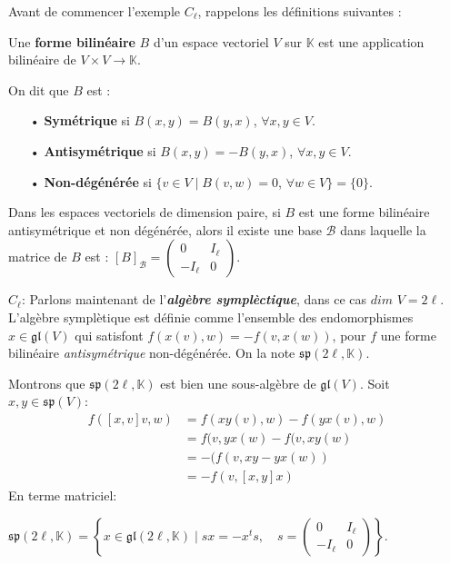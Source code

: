 \documentclass[a4paper,openany,12pt]{report}
\newcommand{\KK}{\mathbb{K}}
\newcommand{\gl}{\mathfrak{gl}}
\newcommand{\ssp}{\mathfrak{sp}}
\theoremstyle{break}
{\theorembodyfont{\upshape}
\newtheorem*{rmq}{Remarque :}
\newtheorem*{prv}{Preuve :}
\newtheorem*{ex}{Exemples :}
\newtheorem*{exe}{Exemple : }
\newtheorem*{nota}{Notation :}
\newtheorem*{dem}{D\'emonstration :}}
\begin{document}
Avant de commencer l'exemple $ C_{\ell} $, rappelons les définitions suivantes :

\begin{df} 
\quad Une \textbf{forme bilinéaire} $B$ d'un espace vectoriel $V$ sur $\KK$ est une application bilinéaire de $V\times V\to  \KK$.

On dit que $B$ est : 
\begin{itemize}
\item[•] \textbf{Symétrique} si $B(x,y)=B(y,x)$, $\forall x,y \in V$. 

\item[•] \textbf{Antisymétrique} si $B(x,y)=-B(y,x)$,  $\forall x,y \in V$. 

\item[•] \textbf{Non-dégénérée} si $\{ v \in V \mid B(v,w)=0$, $\forall w \in V \}= \{ 0 \}$.
\end{itemize}
\end{df}

\begin{rmq} 
\quad Dans  les espaces vectoriels de dimension paire, si $B$ est une forme bilinéaire antisymétrique et non dégénérée, alors il existe une base $\mathcal{B}$ dans laquelle la matrice de $B$ est : $[ B ]_\mathcal{B}=\begin{pmatrix} 0 & I_\ell \\ -I_\ell & 0 \end{pmatrix} $.
\end{rmq}

$ C_{\ell} $: Parlons maintenant de l'\emph{\textbf{algèbre symplèctique}}, dans ce cas $dim$ $V=2 \ell$. L'algèbre symplètique est définie comme l'ensemble des endomorphismes $x \in \gl(V)$ qui satisfont $f(x(v),w)=-f(v,x(w))$, pour $f$ une forme bilinéaire \textit{antisymétrique} non-dégénérée. On la note $\ssp (2\ell,\KK)$.

Montrons que $\ssp(2 \ell,\KK)$ est bien une sous-algèbre de $\gl(V)$. 
Soit $ x,y \in \ssp (V) $:
\begin{align*}
f([x,v]v ,w) &= f(xy(v),w)-f(yx(v),w) \\
           &= f(v,yx(w)-f(v,xy(w) \\
           &= -(f(v,xy-yx(w) )\\
           &=-f(v,[x,y]x)
\end{align*} 
En terme matriciel:
\begin{center}
$\ssp (2 \ell,\KK)= \left \{ x\in \gl(2\ell,\KK) \mid sx=-x^ts, \quad s=\begin{pmatrix} 0 & I_\ell \\ -I_\ell & 0 \end{pmatrix} \right \}$.
\end{center}
\end{document}
